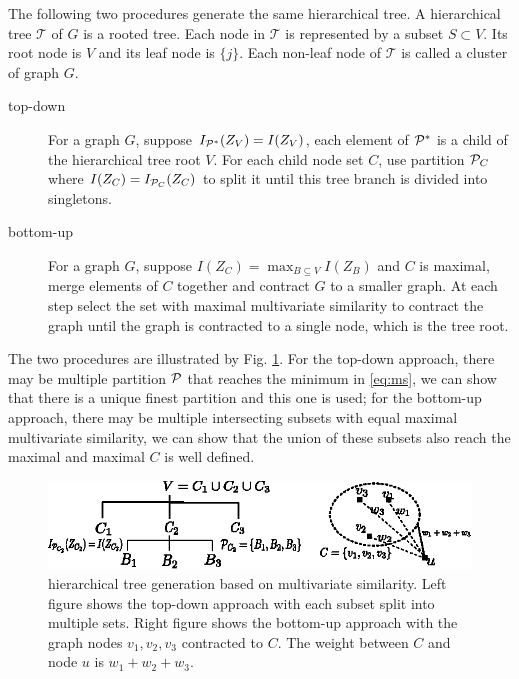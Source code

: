 \documentclass{article}
\begin{document}
\begin{theorem}\label{thm:ta}
The following two procedures generate the same hierarchical tree. A hierarchical tree $\mathcal{T}$ of $G$ is a rooted tree. Each node in $\mathcal{T}$ is represented by a subset $S \subset V$. Its root node is $V$ and its leaf node is $\{j\}$. Each non-leaf node of $\mathcal{T}$ is called a cluster of graph $G$.
\begin{description}
\item[top-down] For a graph $G$, suppose $I_{\P^*}(Z_V)=I(Z_V)$, each element of $\P^*$ is a child of the hierarchical tree root $V$. For each child node set $C$, use partition $\P_C$ where $I(Z_C)=I_{\P_C}(Z_C)$ to split it until this tree branch is divided into singletons.
\item[bottom-up] For a graph $G$, suppose $I(Z_C) = \max_{B\subseteq V} I(Z_B)$ and $C$ is maximal, merge elements of $C$ together and contract $G$ to a smaller graph. At each step select the set with maximal multivariate similarity to contract the graph until the graph is contracted to a single node, which is the tree root.
\end{description}
\end{theorem}
The two procedures are illustrated by Fig. \ref{fig:ta}. For the top-down approach, there may be multiple partition $\P$ that reaches the minimum in \eqref{eq:ms}, we can show that there is a unique finest partition and this one is used; for the bottom-up approach, there may be multiple intersecting subsets with equal maximal multivariate similarity, we can show that the union of these subsets also reach the maximal and maximal $C$ is well defined.
\begin{figure}
\centering
\includegraphics[width=\textwidth]{pic/two_approach.eps}
\caption{hierarchical tree generation based on multivariate similarity. Left figure shows the top-down approach with each subset split into multiple sets. Right figure shows the bottom-up approach with the graph nodes $v_1,v_2,v_3$ contracted to $C$. The weight between $C$ and node $u$ is $w_1+w_2+w_3$.}\label{fig:ta}
\end{figure}
\end{document}
